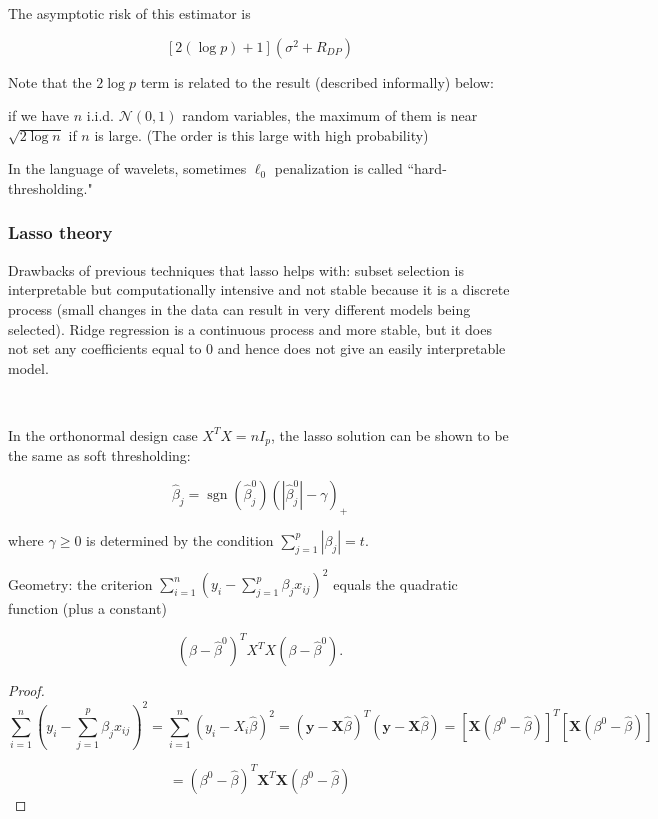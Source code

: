 The asymptotic risk of this estimator is 

\[
[2(\log p) + 1](\sigma^2 + R_{DP})
\]

Note that the \(2 \log p\) term is related to the result (described informally) below:

\begin{proposition}
if we have \(n\) i.i.d. \(\mathcal{N}(0,1)\) random variables, the maximum of them is near \(\sqrt{2 \log n}\) if \(n\) is large. (The order is this large with high probability)
\end{proposition}

\begin{remark} In the language of wavelets, sometimes \(\ell_0\) penalization is called ``hard-thresholding."

\end{remark}

\subsubsection{Lasso theory}

Drawbacks of previous techniques that lasso helps with: subset selection is interpretable but computationally intensive and not stable because it is a discrete process (small changes in the data can result in very different models being selected). Ridge regression is a continuous process and more stable, but it does not set any coefficients equal to 0 and hence does not give an easily interpretable model.

\

In the orthonormal design case \(X^T X = n I_p\), the lasso solution can be shown to be the same as soft thresholding:

\[
\hat{\beta}_j = \operatorname{sgn}(\hat{\beta}_j^0) (| \hat{\beta}_j^0| - \gamma)_+
\]

where \(\gamma \geq 0\) is determined by the condition \(\sum_{j=1}^p |\beta_j| = t\).

Geometry: the criterion \(\sum_{i=1}^n (y_i - \sum_{j=1}^p \beta_j x_{ij})^2\) equals the quadratic function (plus a constant)

\[
(\beta - \hat{\beta}^0)^TX^T X(\beta - \hat{\beta}^0).
\]

\begin{proof}

\[
\sum_{i=1}^n \left(y_i - \sum_{j=1}^p \beta_j x_{ij} \right)^2 = \sum_{i=1}^n \left(y_i - X_i \hat{\beta}\right)^2 = (\boldsymbol{y} - \boldsymbol{X}\hat{\beta})^T (\boldsymbol{y} - \boldsymbol{X}\hat{\beta}) = [ \boldsymbol{X}(\beta^0 -\hat{\beta})]^T [ \boldsymbol{X}(\beta^0 -\hat{\beta})]
\]

\[
 = (\beta^0 -\hat{\beta})^T \boldsymbol{X}^T  \boldsymbol{X}(\beta^0 -\hat{\beta})
\]

\end{proof}

